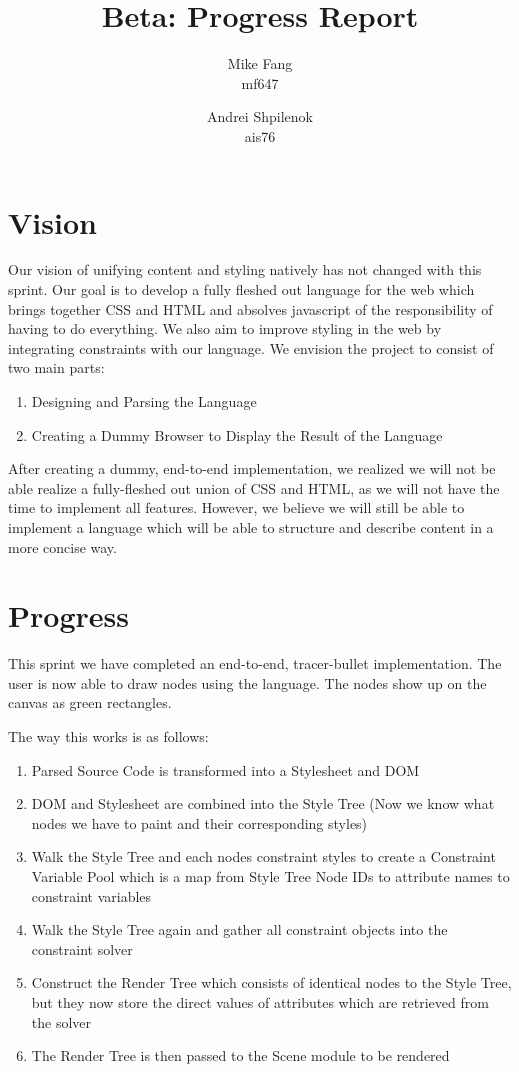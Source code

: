 \documentclass{article}
\title{Beta: Progress Report}
\author{Mike Fang\\ mf647 \and Andrei Shpilenok\\ ais76}
\begin{document}
\maketitle
\section*{Vision}
Our vision of unifying content and styling natively has not
changed with this sprint. Our goal is to develop a fully fleshed out language
for the web which brings together CSS and HTML and absolves
javascript of the responsibility of having to do everything. We also aim to improve 
styling in the web by integrating constraints with our language. We envision the
project to consist of two main parts:
\begin{enumerate}
	\item Designing and Parsing the Language
	\item Creating a Dummy Browser to Display the Result of the Language
\end{enumerate}

After creating a dummy, end-to-end implementation, we realized we will not
be able realize a fully-fleshed out union of CSS and HTML, as we will
not have the time to implement all features. However,
we believe we will still be able to implement a language which will be
able to structure and describe content in a more concise way.

\section*{Progress}

This sprint we have completed an end-to-end, tracer-bullet implementation.
The user is now able to draw nodes using the
language. The nodes show up on the canvas as green rectangles.

The way this works is as follows:
\begin{enumerate}
    \item Parsed Source Code is transformed into a Stylesheet and DOM
    \item DOM and Stylesheet are combined into the Style Tree
          (Now we know what nodes we have to paint and their corresponding styles)
    \item Walk the Style Tree and each nodes constraint styles to create a Constraint Variable Pool which is a map from
          Style Tree Node IDs to attribute names to constraint variables
    \item Walk the Style Tree again and gather all constraint objects into the
          constraint solver
    \item Construct the Render Tree which consists of identical nodes to the Style Tree,
          but they now store the direct values of attributes which are retrieved from
          the solver
    \item The Render Tree is then passed to the Scene module to be rendered
\end{enumerate}
\end{document}
